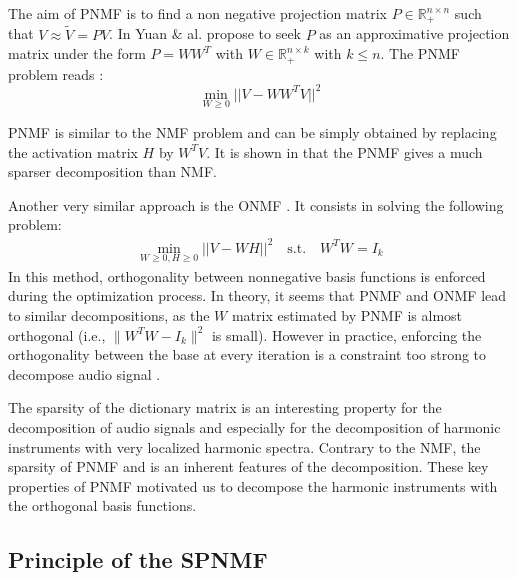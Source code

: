 \documentclass[journal]{IEEEtran}
\begin{document}
The aim of PNMF is to find a non negative projection matrix $P \in \mathbb{R}_{+}^{n \times n}$ such that $V \approx \tilde{V} = PV$. In \cite{yuanOja2005} Yuan \& al. propose to seek $P$ as an approximative projection matrix under the form $P = WW^{T}$ with $W \in \mathbb{R}_{+}^{n \times k}$ with $ k \leqslant n $. The PNMF problem reads : 
\begin{equation}\label{EqPnmf}
\min_{W \geqslant 0} ||V - WW^{T}V||^2 
\end{equation}

PNMF is similar to the NMF problem and can be simply obtained by replacing the activation matrix $H$ by $W^TV$. It is shown in \cite{YangOja10} that the PNMF gives a much sparser decomposition than NMF.

Another very similar approach is the ONMF \cite{choi}. It consists in solving the following problem: 
\begin{align}
\min_{W \geqslant 0, H \geqslant0} ||V - WH||^2 \quad   \text{s.t}.\quad W^{T}W=I_{k} 
\end{align}%
In this method, orthogonality between nonnegative basis functions is enforced during the optimization process. In theory, it seems that PNMF and ONMF lead to similar decompositions, as the $W$ matrix estimated by PNMF is almost orthogonal (i.e., $\|W^{T}W-I_{k}\|^{2}$ is small). However in practice, enforcing the orthogonality between the base at every iteration is a constraint too strong to decompose audio signal \cite{laroche2015structured}. 

The sparsity of the dictionary matrix is an interesting property for the decomposition of audio signals and especially for the decomposition of harmonic instruments with very localized harmonic spectra. Contrary to the NMF, the sparsity of PNMF and is an inherent features of the decomposition. These key properties of PNMF motivated us to decompose the harmonic instruments with the orthogonal basis functions.


\subsection{Principle of the SPNMF}
\end{document}
